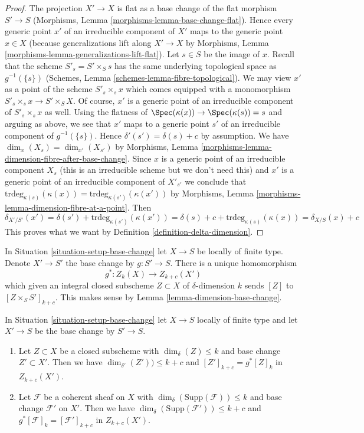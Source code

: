 \begin{proof}
The projection $X' \to X$ is flat as a base change of the flat morphism
$S' \to S$ (Morphisms, Lemma \ref{morphisms-lemma-base-change-flat}).
Hence every generic point $x'$ of an irreducible
component of $X'$ maps to the generic point $x \in X$ (because generalizations
lift along $X' \to X$ by
Morphisms, Lemma \ref{morphisms-lemma-generalizations-lift-flat}).
Let $s \in S$ be the image of $x$.
Recall that the scheme $S'_s = S' \times_S s$
has the same underlying topological space as $g^{-1}(\{s\})$
(Schemes, Lemma \ref{schemes-lemma-fibre-topological}).
We may view $x'$ as a point of the scheme $S'_s \times_s x$ which
comes equipped with a monomorphism $S'_s \times_s x \to S' \times_S X$.
Of course, $x'$ is a generic point of an irreducible component
of $S'_s \times_s x$ as well.
Using the flatness of $\Spec(\kappa(x)) \to \Spec(\kappa(s)) = s$
and arguing as above, we see that $x'$ maps to a generic point $s'$
of an irreducible component of $g^{-1}(\{s\})$. Hence
$\delta'(s') = \delta(s) + c$ by assumption.
We have $\dim_x(X_s) = \dim_{x'}(X_{s'})$ by
Morphisms, Lemma \ref{morphisms-lemma-dimension-fibre-after-base-change}.
Since $x$ is a generic point of an irreducible component $X_s$
(this is an irreducible scheme but we don't need this) and
$x'$ is a generic point of an irreducible component of $X'_{s'}$ we conclude
that $\text{trdeg}_{\kappa(s)}(\kappa(x)) = 
\text{trdeg}_{\kappa(s')}(\kappa(x'))$
by Morphisms, Lemma \ref{morphisms-lemma-dimension-fibre-at-a-point}.
Then
$$
\delta_{X'/S'}(x') = \delta(s') + \text{trdeg}_{\kappa(s')}(\kappa(x')) =
\delta(s) + c + \text{trdeg}_{\kappa(s)}(\kappa(x)) = \delta_{X/S}(x) + c
$$
This proves what we want by Definition \ref{definition-delta-dimension}.
\end{proof}

\noindent
In Situation \ref{situation-setup-base-change} let $X \to S$ be locally
of finite type. Denote $X' \to S'$ the base change by $g : S' \to S$.
There is a unique homomorphism
$$
g^* : Z_k(X) \longrightarrow Z_{k + c}(X')
$$
which given an integral closed subscheme $Z \subset X$ of
$\delta$-dimension $k$ sends $[Z]$ to $[Z \times_S S']_{k + c}$.
This makes sense by Lemma \ref{lemma-dimension-base-change}.

\begin{lemma}
\label{lemma-pullback-coherent-base-change}
In Situation \ref{situation-setup-base-change} let $X \to S$
locally of finite type and let $X' \to S$ be the base change by $S' \to S$.
\begin{enumerate}
\item Let $Z \subset X$ be a closed subscheme with
$\dim_\delta(Z) \leq k$ and base change $Z' \subset X'$. Then we have
$\dim_{\delta'}(Z')) \leq k + c$
and $[Z']_{k + c} = g^*[Z]_k$ in $Z_{k + c}(X')$.
\item Let $\mathcal{F}$ be a coherent sheaf on $X$ with
$\dim_\delta(\text{Supp}(\mathcal{F})) \leq k$ and base
change $\mathcal{F}'$ on $X'$.
Then we have $\dim_\delta(\text{Supp}(\mathcal{F}')) \leq k + c$
and $g^*[\mathcal{F}]_k = [\mathcal{F}']_{k + c}$
in $Z_{k + c}(X')$.
\end{enumerate}
\end{lemma}

